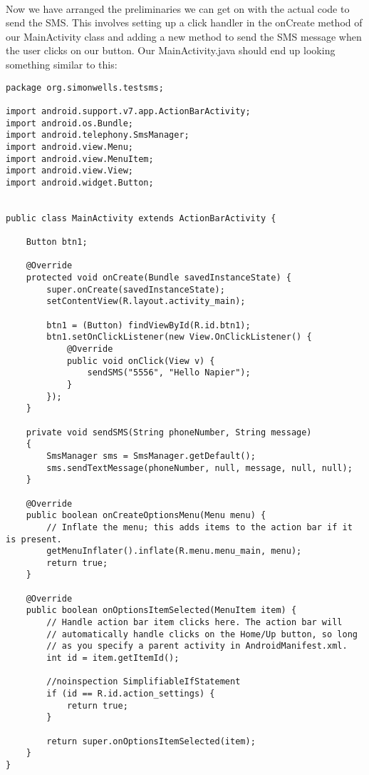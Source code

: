 \paragraph{} Now we have arranged the preliminaries we can get on with the actual code to send the SMS. This involves setting up a click handler in the onCreate method of our MainActivity class and adding a new method to send the SMS message when the user clicks on our button. Our MainActivity.java should end up looking something similar to this:

\begin{lstlisting}
package org.simonwells.testsms;

import android.support.v7.app.ActionBarActivity;
import android.os.Bundle;
import android.telephony.SmsManager;
import android.view.Menu;
import android.view.MenuItem;
import android.view.View;
import android.widget.Button;


public class MainActivity extends ActionBarActivity {

    Button btn1;

    @Override
    protected void onCreate(Bundle savedInstanceState) {
        super.onCreate(savedInstanceState);
        setContentView(R.layout.activity_main);

        btn1 = (Button) findViewById(R.id.btn1);
        btn1.setOnClickListener(new View.OnClickListener() {
            @Override
            public void onClick(View v) {
                sendSMS("5556", "Hello Napier");
            }
        });
    }

    private void sendSMS(String phoneNumber, String message)
    {
        SmsManager sms = SmsManager.getDefault();
        sms.sendTextMessage(phoneNumber, null, message, null, null);
    }

    @Override
    public boolean onCreateOptionsMenu(Menu menu) {
        // Inflate the menu; this adds items to the action bar if it is present.
        getMenuInflater().inflate(R.menu.menu_main, menu);
        return true;
    }

    @Override
    public boolean onOptionsItemSelected(MenuItem item) {
        // Handle action bar item clicks here. The action bar will
        // automatically handle clicks on the Home/Up button, so long
        // as you specify a parent activity in AndroidManifest.xml.
        int id = item.getItemId();

        //noinspection SimplifiableIfStatement
        if (id == R.id.action_settings) {
            return true;
        }

        return super.onOptionsItemSelected(item);
    }
}
\end{lstlisting}


